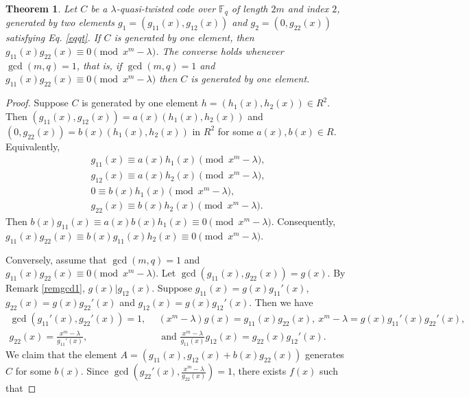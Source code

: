 \documentclass[12 pt]{extarticle}
\numberwithin{equation}{section}
\newtheorem{theorem}{Theorem}[section]
\theoremstyle{definition}
\begin{document}
 
 \begin{theorem}\label{2to1}
Let $C$ be a $\lambda$-quasi-twisted code over $\mathbb{F}_q$ of length $2m$ and index $2$, generated by two elements $g_1=(g_{11}(x),g_{12}(x))$ and $g_2=(0,g_{22}(x))$ satisfying Eq. \ref{eqqt}. If $C$ is generated by one element, then $g_{11}(x)g_{22}(x)\equiv 0\pmod{x^m-\lambda}$. The converse holds whenever $\gcd(m,q)=1$, that is, if $\gcd(m,q)=1$ and $g_{11}(x)g_{22}(x)\equiv 0\pmod{x^m-\lambda}$ then $C$ is generated by one element.     
 \end{theorem}
 \begin{proof}
     Suppose $C$ is generated by one element $h=(h_1(x),h_2(x))\in R^2$. Then
     $(g_{11}(x),g_{12}(x))=a(x)(h_1(x),h_2(x))$ and $(0,g_{22}(x))=b(x)(h_1(x),h_2(x))$ in $R^2$ for some $a(x),b(x)\in R$.
     Equivalently,
     \begin{equation*}
         \begin{split}
             g_{11}(x)\equiv a(x)h_1(x) \pmod{x^m-\lambda},\\
             g_{12}(x)\equiv a(x)h_2(x) \pmod{x^m-\lambda},\\
             0\equiv b(x)h_1(x)\pmod{x^m-\lambda},\\
             g_{22}(x)\equiv b(x)h_2(x) \pmod{x^m-\lambda}.
         \end{split}
     \end{equation*}
 Then $b(x)g_{11}(x)\equiv a(x)b(x)h_1(x)\equiv 0 \pmod{x^m-\lambda}$.  Consequently, $g_{11}(x)g_{22}(x)\equiv b(x)g_{11}(x)h_2(x)\equiv 0 \pmod{x^m-\lambda}$.

 Conversely, assume that $\gcd(m,q)=1$ and $g_{11}(x)g_{22}(x)\equiv 0 \pmod{x^m-\lambda}$. Let $\gcd(g_{11}(x),g_{22}(x))=g(x)$. By Remark \ref{remgcd1}, $g(x)|g_{12}(x)$. Suppose $g_{11}(x)=g(x)g_{11}'(x)$, $g_{22}(x)=g(x)g_{22}'(x)$ and $g_{12}(x)=g(x)g_{12}'(x)$. Then we have
 \begin{equation*}
     \begin{split}
      \gcd(g_{11}'(x),g_{22}'(x))=1, \ \ & (x^m-\lambda)g(x)=g_{11}(x)g_{22}(x),\   x^m-\lambda=g(x)g_{11}'(x)g_{22}'(x), \\
      g_{22}(x)=\frac{x^m-\lambda}{g_{11}'(x)}, & \text{ and }\frac{x^m-\lambda}{g_{11}(x)}g_{12}(x)=g_{22}(x)g_{12}'(x).
     \end{split}
 \end{equation*}
 We claim that the element $A=( g_{11}(x), g_{12}(x)+b(x)g_{22}(x))$ generates $C$ for some $b(x)$. 
 Since $\gcd(g_{22}'(x),\frac{x^m-\lambda}{g_{22}(x)})=1$, there exists $f(x)$ such that 


\end{proof}
\end{document}
